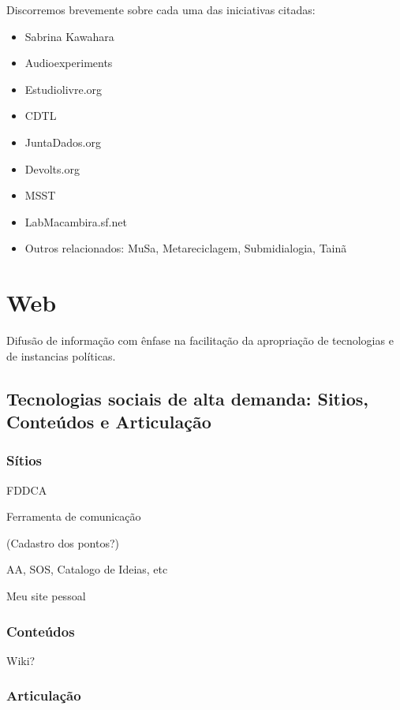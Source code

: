 Discorremos brevemente sobre cada uma das iniciativas citadas:

\begin{itemize}
    \item Sabrina Kawahara
    \item Audioexperiments
    \item Estudiolivre.org
    \item CDTL
    \item JuntaDados.org
    \item Devolts.org
    \item MSST
    \item LabMacambira.sf.net
    \item Outros relacionados: MuSa, Metareciclagem, Submidialogia, Tainã
\end{itemize}


\section{Web}

  Difusão de informação com ênfase na facilitação
  da apropriação de tecnologias e de instancias políticas.

   \subsection{Tecnologias sociais de alta demanda: Sitios, Conteúdos e Articulação}

      \subsubsection{Sítios}

      FDDCA

      Ferramenta de comunicação

      (Cadastro dos pontos?)

      AA, SOS, Catalogo de Ideias, etc

      Meu site pessoal


      \subsubsection{Conteúdos}

      Wiki?

      \subsubsection{Articulação}

